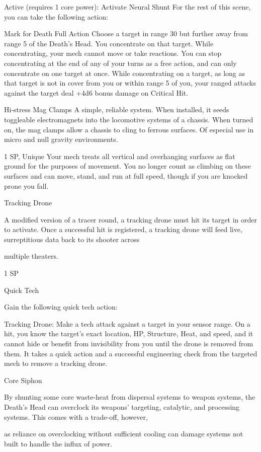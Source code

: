   Active (requires 1 core power): Activate Neural Shunt
   For the rest of this scene, you can take the following action:

  Mark for Death
  Full Action
   Choose a target in range 30 but further away from range 5 of the Death’s Head. You concentrate on that
  target. While concentrating, your mech cannot move or take reactions. You can stop concentrating at
  the end of any of your turns as a free action, and can only concentrate on one target at once.
  While concentrating on a target, as long as that target is not in cover from you or within range 5 of you,
  your ranged attacks against the target deal +4d6 bonus damage on Critical Hit.

Hi-stress Mag Clamps
A simple, reliable system. When installed, it seeds toggleable electromagnets into the locomotive systems
of a chassis. When turned on, the mag clamps allow a chassis to cling to ferrous surfaces. Of especial use
in micro and null gravity environments.

1 SP, Unique
Your mech treats all vertical and overhanging surfaces as flat ground for the purposes of
movement. You no longer count as climbing on these surfaces and can move, stand, and run at
full speed, though if you are knocked prone you fall.


Tracking Drone

A modified version of a tracer round, a tracking drone must hit its target in order to activate. Once a
successful hit is registered, a tracking drone will feed live, surreptitious data back to its shooter across

multiple theaters.

1 SP

Quick Tech

Gain the following quick tech action:

	        Tracking Drone: Make a tech attack against a target in your sensor range. On a hit, you
know the target’s exact location, HP, Structure, Heat, and speed, and it cannot hide or benefit
from invisibility from you until the drone is removed from them. It takes a quick action and a
successful engineering check from the targeted mech to remove a tracking drone.


Core Siphon

By shunting some core waste-heat from dispersal systems to weapon systems, the Death’s Head can
overclock its weapons’ targeting, catalytic, and processing systems. This comes with a trade-off, however,

as reliance on overclocking without sufficient cooling can damage systems not built to handle the influx of
power.




